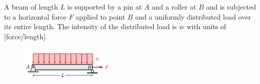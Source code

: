 
A beam of length $L$ is supported by a pin at $A$ and a roller at $B$ and is subjected to a horizontal force $F$ applied to point $B$ and a uniformly distributed load over its entire length. The intensity of the distributed load is $w$ with units of [force/length].

\begin{figure}[ht!]
  \centering
  \includegraphics[width=0.4\textwidth,height=0.5\textheight,keepaspectratio]{fig.png}
\end{figure}


